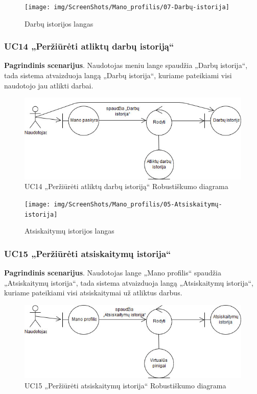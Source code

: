 \documentclass{VUMIFPSbakalaurinis}
\begin{document}
\begin{figure}[H]
	\centering
	\texttt{[image: img/ScreenShots/Mano\_profilis/07-Darbų-istorija]}
	\caption{Darbų istorijos langas}
	\label{img:work history}
\end{figure}
\subsubsection{UC14 „Peržiūrėti atliktų darbų istoriją“}
\textbf{Pagrindinis scenarijus}. Naudotojas meniu lange spaudžia „Darbų istorija“, tada sistema atvaizduoja langą „Darbų istorija“, kuriame pateikiami visi naudotojo jau atlikti darbai.

\begin{figure}[H]
	\centering
	\includegraphics[scale=0.6]{img/Robustness/UC14}
	\caption{UC14 „Peržiūrėti atliktų darbų istoriją“ Robustiškumo diagrama}
	\label{img:uc14rob}
\end{figure}

\begin{figure}[H]
	\centering
	\texttt{[image: img/ScreenShots/Mano\_profilis/05-Atsiskaitymų-istorija]}
	\caption{Atsiskaitymų istorijos langas}
	\label{img:payment history}
\end{figure}
\subsubsection{UC15 „Peržiūrėti atsiskaitymų istorija“}
\textbf{Pagrindinis scenarijus}. Naudotojas lange „Mano profilis“ spaudžia „Atsiskaitymų istorija“, tada sistema atvaizduoja langą „Atsiskaitymų istorija“, kuriame pateikiami visi atsiskaitymai už atliktus darbus.

\begin{figure}[H]
	\centering
	\includegraphics[scale=0.6]{img/Robustness/UC15}
	\caption{UC15 „Peržiūrėti atsiskaitymų istorija“ Robustiškumo diagrama}
	\label{img:uc15rob}
\end{figure}
\end{document}
